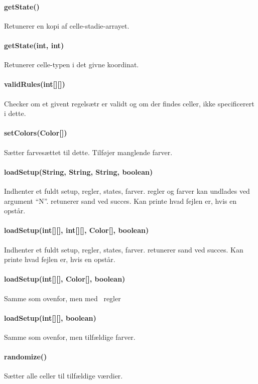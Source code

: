 \paragraph{getState()} Retunerer en kopi af celle-stadie-arrayet.

\paragraph{getState(int, int)} Retunerer celle-typen i det givne koordinat.

\paragraph{validRules(int[][])} Checker om et givent regelsætr er validt og om der findes celler, ikke specificerert i dette.

\paragraph{setColors(Color[])} Sætter farvesættet til dette. Tilføjer manglende farver.

\paragraph{loadSetup(String, String, String, boolean)} Indhenter et fuldt setup, regler, states, farver. regler og farver kan undlades ved argument ``N''.
retunerer sand ved succes. Kan printe hvad fejlen er, hvis en opstår.

\paragraph{loadSetup(int[][], int[][], Color[], boolean)} Indhenter et fuldt setup, regler, states, farver.
retunerer sand ved succes. Kan printe hvad fejlen er, hvis en opstår.

\paragraph{loadSetup(int[][], Color[], boolean)} Samme som ovenfor, men med \gol~regler

\paragraph{loadSetup(int[][], boolean)} Samme som ovenfor, men tilfældige farver.

\paragraph{randomize()} Sætter alle celler til tilfældige værdier.

